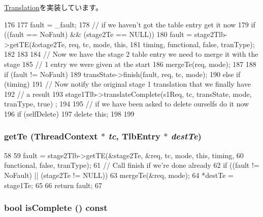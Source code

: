 \hyperlink{classBaseTLB_1_1Translation_a5698e0a932f298729d10355d4384e565}{Translation}を実装しています。


\begin{DoxyCode}
176 {
177     fault = _fault;
178     // if we haven't got the table entry get it now
179     if ((fault == NoFault) && (stage2Te == NULL)) {
180         fault = stage2Tlb->getTE(&stage2Te, req, tc, mode, this,
181             timing, functional, false, tranType);
182     }
183 
184     // Now we have the stage 2 table entry we need to merge it with the stage
185     // 1 entry we were given at the start
186     mergeTe(req, mode);
187 
188     if (fault != NoFault) {
189         transState->finish(fault, req, tc, mode);
190     } else if (timing) {
191         // Now notify the original stage 1 translation that we finally have
192         // a result
193         stage1Tlb->translateComplete(s1Req, tc, transState, mode, tranType, true)
      ;
194     }
195     // if we have been asked to delete ourselfs do it now
196     if (selfDelete) {
197         delete this;
198     }
199 }
\end{DoxyCode}
\hypertarget{classArmISA_1_1Stage2LookUp_acc13008b8a9b54bb9ce96f72a86078cd}{
\subsubsection[{getTe}]{ getTe ({\bf ThreadContext} $\ast$ {\em tc}, \/  {\bf TlbEntry} $\ast$ {\em destTe})}}
\label{classArmISA_1_1Stage2LookUp_acc13008b8a9b54bb9ce96f72a86078cd}



\begin{DoxyCode}
58 {
59     fault = stage2Tlb->getTE(&stage2Te, &req, tc, mode, this, timing,
60                                    functional, false, tranType);
61     // Call finish if we're done already
62     if ((fault != NoFault) || (stage2Te != NULL)) {
63         mergeTe(&req, mode);
64         *destTe = stage1Te;
65     }
66     return fault;
67 }
\end{DoxyCode}
\hypertarget{classArmISA_1_1Stage2LookUp_a8f31086c831baedbaa74038c8434fb7f}{
\subsubsection[{isComplete}]{\setlength{\rightskip}{0pt plus 5cm}bool isComplete () const}}
\label{classArmISA_1_1Stage2LookUp_a8f31086c831baedbaa74038c8434fb7f}



